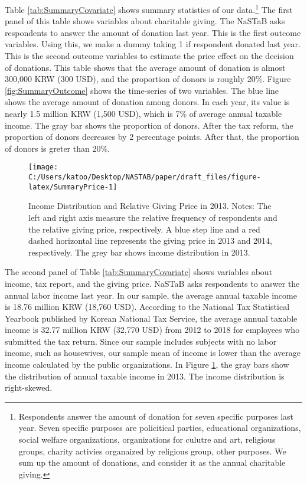 \documentclass[
  11pt,
  a4paper,
]{article}
\begin{document}
Table \ref{tab:SummaryCovariate}
shows summary statistics of our data.\footnote{Respondents answer the amount of donation for seven specific purposes last year. Seven specific purposes are policitical parties, educational organizations, social welfare organizations, organizations for culutre and art, religious groups, charity activies organaized by religious group, other purposes. We sum up the amount of donations, and consider it as the annual charitable giving.}
The first panel of this table shows variables about charitable giving.
The NaSTaB asks respondents to answer the amount of donation last year.
This is the first outcome variables.
Using this, we make a dummy taking 1 if respondent donated last year.
This is the second outcome variables to
estimate the price effect on the decision of donations.
This table shows that
the average amount of donation is almost 300,000 KRW (300 USD),
and the proportion of donors is roughly 20\%.
Figure \ref{fig:SummaryOutcome} shows the time-series of two variables.
The blue line shows the average amount of donation among donors.
In each year, its value is nearly 1.5 million KRW (1,500 USD),
which is 7\% of average annual taxable income.
The gray bar shows the proportion of donors.
After the tax reform, the proportion of donors decreases
by 2 percentage points.
After that, the proportion of donors is greter than 20\%.

\begin{figure}[t]

{\centering \texttt{[image: C:/Users/katoo/Desktop/NASTAB/paper/draft\_files/figure-latex/SummaryPrice-1]} 

}

\caption{Income Distribution and Relative Giving Price in 2013. Notes: The left and right axis measure the relative frequency of respondents and the relative giving price, respectively. A blue step line and a red dashed horizontal line represents the giving price in 2013 and 2014, respectively. The grey bar shows income distribution in 2013.}\label{fig:SummaryPrice}
\end{figure}

The second panel of Table \ref{tab:SummaryCovariate}
shows variables about income, tax report, and the giving price.
NaSTaB asks respondents to answer the annual labor income last year.
In our sample,
the average annual taxable income is 18.76 million KRW (18,760 USD).
According to the National Tax Statistical Yearbook
published by Korean National Tax Service,
the average annual taxable income is
32.77 million KRW (32,770 USD) from 2012 to 2018
for employees who submitted the tax return.
Since our sample includes subjects with no labor income, such as housewives,
our sample mean of income is lower than
the average income calculated by the public organizations.
In Figure \ref{fig:SummaryPrice},
the gray bars show the distribution of annual taxable income in 2013.
The income distribution is right-skewed.
\end{document}
